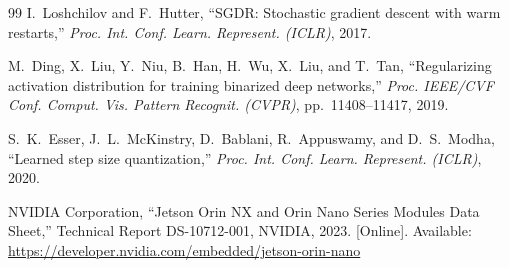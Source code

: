 \documentclass[journal]{IEEEtran}
\begin{document}
\begin{thebibliography}{99}
I.~Loshchilov and F.~Hutter,
``SGDR: Stochastic gradient descent with warm restarts,''
\textit{Proc. Int. Conf. Learn. Represent. (ICLR)}, 2017.

M.~Ding, X.~Liu, Y.~Niu, B.~Han, H.~Wu, X.~Liu, and T.~Tan,
``Regularizing activation distribution for training binarized deep networks,''
\textit{Proc. IEEE/CVF Conf. Comput. Vis. Pattern Recognit. (CVPR)}, pp.~11408--11417, 2019.

S.~K.~Esser, J.~L.~McKinstry, D.~Bablani, R.~Appuswamy, and
D.~S.~Modha,
``Learned step size quantization,''
\textit{Proc. Int. Conf. Learn. Represent. (ICLR)}, 2020.

NVIDIA Corporation,
``Jetson Orin NX and Orin Nano Series Modules Data Sheet,''
Technical Report DS-10712-001, NVIDIA, 2023.
[Online]. Available: \url{https://developer.nvidia.com/embedded/jetson-orin-nano}

\end{thebibliography}
\end{document}
